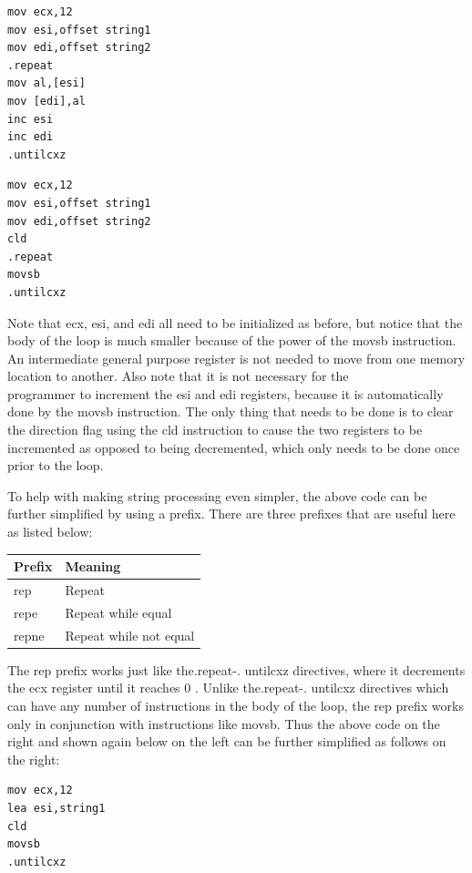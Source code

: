 \documentclass[10pt]{article}
\begin{document}
\begin{verbatim}
mov ecx,12
mov esi,offset string1
mov edi,offset string2
.repeat
mov al,[esi]
mov [edi],al
inc esi
inc edi
.untilcxz
\end{verbatim}

\begin{verbatim}
mov ecx,12
mov esi,offset string1
mov edi,offset string2
cld
.repeat
movsb
.untilcxz
\end{verbatim}

Note that ecx, esi, and edi all need to be initialized as before, but notice that the body of the loop is much smaller because of the power of the movsb instruction. An intermediate general purpose register is not needed to move from one memory location to another. Also note that it is not necessary for the\\
programmer to increment the esi and edi registers, because it is automatically done by the movsb instruction. The only thing that needs to be done is to clear the direction flag using the cld instruction to cause the two registers to be incremented as opposed to being decremented, which only needs to be done once prior to the loop.

To help with making string processing even simpler, the above code can be further simplified by using a prefix. There are three prefixes that are useful here as listed below:

\begin{center}
\begin{tabular}{|l|l|}
\hline
Prefix & Meaning \\
\hline
rep & Repeat \\
\hline
repe & Repeat while equal \\
\hline
repne & Repeat while not equal \\
\hline
\end{tabular}
\end{center}

The rep prefix works just like the.repeat-. untilcxz directives, where it decrements the ecx register until it reaches 0 . Unlike the.repeat-. untilcxz directives which can have any number of instructions in the body of the loop, the rep prefix works only in conjunction with instructions like movsb. Thus the above code on the right and shown again below on the left can be further simplified as follows on the right:

\begin{verbatim}
mov ecx,12
lea esi,string1
cld
movsb
.untilcxz
\end{verbatim}
\end{document}
